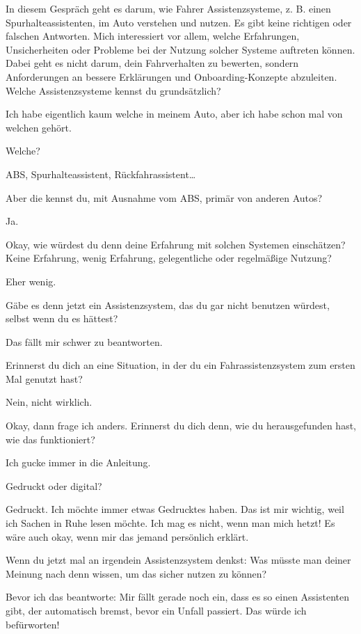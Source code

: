 \interviewerin
In diesem Gespräch geht es darum, wie Fahrer Assistenzsysteme, z. B.
einen Spurhalteassistenten, im Auto verstehen und nutzen. Es gibt keine
richtigen oder falschen Antworten. Mich interessiert vor allem, welche
Erfahrungen, Unsicherheiten oder Probleme bei der Nutzung solcher
Systeme auftreten können. Dabei geht es nicht darum, dein Fahrverhalten
zu bewerten, sondern Anforderungen an bessere Erklärungen und
Onboarding-Konzepte abzuleiten. Welche Assistenzsysteme kennst du
grundsätzlich?

Ich habe eigentlich kaum welche in meinem Auto, aber ich habe schon mal
von welchen gehört.

\interviewerin
Welche?

ABS, Spurhalteassistent, Rückfahrassistent…

\interviewerin
Aber die kennst du, mit Ausnahme vom ABS, primär von anderen Autos?

Ja.

\interviewerin
Okay, wie würdest du denn deine Erfahrung mit solchen Systemen
einschätzen? Keine Erfahrung, wenig Erfahrung, gelegentliche oder
regelmäßige Nutzung?

Eher wenig.

\interviewerin
Gäbe es denn jetzt ein Assistenzsystem, das du gar nicht benutzen
würdest, selbst wenn du es hättest?

Das fällt mir schwer zu beantworten.

\interviewerin
Erinnerst du dich an eine Situation, in der du ein Fahrassistenzsystem
zum ersten Mal genutzt hast?

Nein, nicht wirklich.

\interviewerin
Okay, dann frage ich anders. Erinnerst du dich denn, wie du
herausgefunden hast, wie das funktioniert?

Ich gucke immer in die Anleitung.

\interviewerin
Gedruckt oder digital?

Gedruckt. Ich möchte immer etwas Gedrucktes haben. Das ist mir wichtig,
weil ich Sachen in Ruhe lesen möchte. Ich mag es nicht, wenn man mich
hetzt! Es wäre auch okay, wenn mir das jemand persönlich erklärt.

\interviewerin
Wenn du jetzt mal an irgendein Assistenzsystem denkst: Was müsste man
deiner Meinung nach denn wissen, um das sicher nutzen zu können?

Bevor ich das beantworte: Mir fällt gerade noch ein, dass es so einen
Assistenten gibt, der automatisch bremst, bevor ein Unfall passiert.
Das würde ich befürworten!


